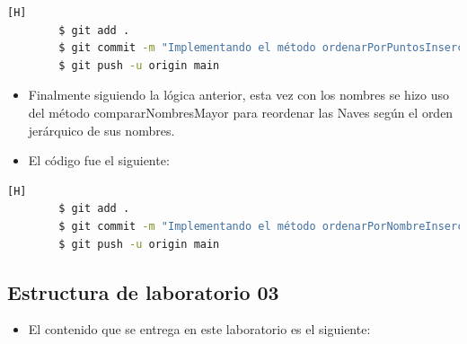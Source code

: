 \documentclass{article}
\begin{document}
    \begin{lstlisting}[language=bash,caption={Commit: Implementando el método ordenarPorPuntosInsercion haciendo uso del algoritmo proporcionado y adaptándolo al código}][H]
		$ git add .
		$ git commit -m "Implementando el método ordenarPorPuntosInsercion haciendo uso del algoritmo proporcionado y adaptándolo al código"			
		$ git push -u origin main
	\end{lstlisting}


 \begin{itemize}	
        \item Finalmente siguiendo la lógica anterior, esta vez con los nombres se hizo uso del método compararNombresMayor para reordenar las Naves según el orden jerárquico de sus nombres.
	\item El código fue el siguiente:
    \end{itemize}
    
    
    \begin{lstlisting}[language=bash,caption={Commit: Implementando el método ordenarPorNombreInsercion utilizando elmétodo compararNombresMayor que fue creado anteriormente, además del algoritmo proporcionado}][H]
		$ git add .
		$ git commit -m "Implementando el método ordenarPorNombreInsercion utilizando elmétodo compararNombresMayor que fue creado anteriormente, además del algoritmo proporcionado"			
		$ git push -u origin main
	\end{lstlisting}





















    
    \newpage
	\subsection{Estructura de laboratorio 03}
    \begin{itemize}	
		\item El contenido que se entrega en este laboratorio es el siguiente:
	\end{itemize}
	
\end{document}
